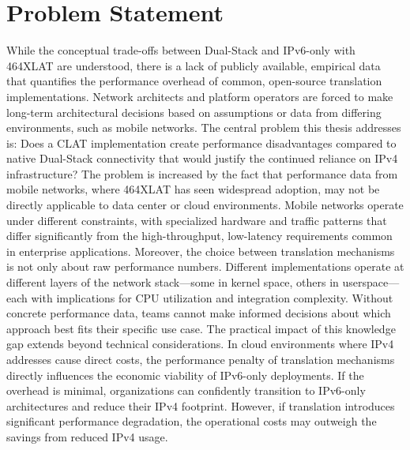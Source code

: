 \section{Problem Statement}
While the conceptual trade-offs between Dual-Stack and IPv6-only with 464XLAT are understood, there is a lack of publicly available, empirical data that quantifies the performance overhead of common, open-source translation implementations. Network architects and platform operators are forced to make long-term architectural decisions based on assumptions or data from differing environments, such as mobile networks.
The central problem this thesis addresses is: Does a CLAT implementation create performance disadvantages compared to native Dual-Stack connectivity that would justify the continued reliance on IPv4 infrastructure?
The problem is increased by the fact that performance data from mobile networks, where 464XLAT has seen widespread adoption, may not be directly applicable to data center or cloud environments. Mobile networks operate under different constraints, with specialized hardware and traffic patterns that differ significantly from the high-throughput, low-latency requirements common in enterprise applications.
Moreover, the choice between translation mechanisms is not only about raw performance numbers. Different implementations operate at different layers of the network stack—some in kernel space, others in userspace—each with implications for CPU utilization and integration complexity. Without concrete performance data, teams cannot make informed decisions about which approach best fits their specific use case.
The practical impact of this knowledge gap extends beyond technical considerations. In cloud environments where IPv4 addresses cause direct costs, the performance penalty of translation mechanisms directly influences the economic viability of IPv6-only deployments. If the overhead is minimal, organizations can confidently transition to IPv6-only architectures and reduce their IPv4 footprint. However, if translation introduces significant performance degradation, the operational costs may outweigh the savings from reduced IPv4 usage.


